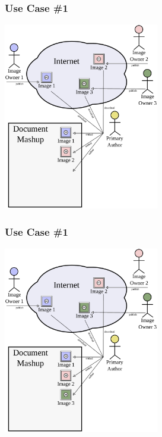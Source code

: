 \documentclass[mathserif,xcolor=dvipsnames,hyperref={bookmarks=true}]{beamer}
\begin{document}
    \begin{frame}[t]
        \frametitle{Use Case \#1}
        \begin{center}
            \includegraphics[width=0.51\textwidth]{../resources/usecases/usecase1/usecase1-step20.pdf}
        \end{center}
    \end{frame}
    \begin{frame}[t]
        \frametitle{Use Case \#1}
        \begin{center}
            \includegraphics[width=0.51\textwidth]{../resources/usecases/usecase1/usecase1-step21.pdf}
        \end{center}
    \end{frame}
\end{document}
